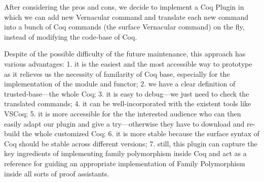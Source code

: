 After considering the pros and cons, we decide to implement a Coq Plugin in which we can add new Vernacular command and translate each new command into a bunch of Coq commands (the surface Vernacular command) on the fly, instead of modifying the code-base of Coq. 

Despite of the possible difficulty of the future maintenance, this approach has various advantages: 1. it is the easiest and the most accessible way to prototype as it relieves us the necessity of familarity of Coq base, especially for the implementation of the module and functor; 2. we have a clear definition of trusted-base---the whole Coq; 3. it is easy to debug---we just need to check the translated commands; 4. it can be well-incorporated with the existent tools like VSCoq; 5. it is more accessible for the the interested audience who can then easily adapt our plugin and give a try---otherwise they have to download and re-build the whole customized Coq; 6. it is more stable because the surface syntax of Coq should be stable across different versions; 7. still, this plugin can capture the key ingredients of implementing family polymorphism inside Coq and act as a reference for guiding an appropriate implementation of Family Polymorphism inside all sorts of proof assistants.

